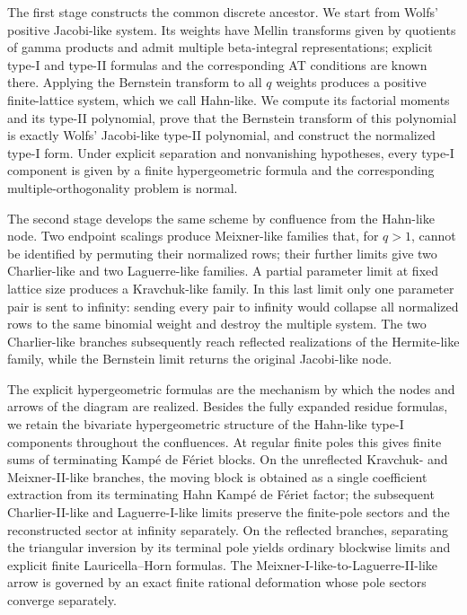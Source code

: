 \documentclass[10pt]{amsart}
\theoremstyle{plain}
\theoremstyle{definition}
\theoremstyle{remark}
\begin{document}
The first stage constructs the common discrete ancestor. We start from
Wolfs' positive Jacobi-like system. Its weights have Mellin transforms
given by quotients of gamma products and admit multiple beta-integral
representations; explicit type-I and type-II formulas and the
corresponding AT conditions are known there. Applying the
Bernstein transform to all \(q\) weights produces a positive
finite-lattice system, which we call Hahn-like. We compute its factorial
moments and its type-II polynomial, prove that the Bernstein transform of
this polynomial is exactly Wolfs' Jacobi-like type-II polynomial, and
construct the normalized type-I form. Under explicit separation and
nonvanishing hypotheses, every type-I component is given by a finite
hypergeometric formula and the corresponding multiple-orthogonality
problem is normal.

The second stage develops the same scheme by confluence from the
Hahn-like node. Two endpoint scalings produce Meixner-like families that,
for \(q>1\), cannot be identified by permuting their normalized rows;
their further limits give two Charlier-like and two Laguerre-like
families. A partial parameter limit at fixed lattice size produces a
Kravchuk-like family. In this last limit only one parameter pair is sent
to infinity: sending every pair to infinity would collapse all normalized
rows to the same binomial weight and destroy the multiple system. The two
Charlier-like branches subsequently reach reflected realizations of the
Hermite-like family, while the Bernstein limit returns the original
Jacobi-like node.

The explicit hypergeometric formulas are the mechanism by which the nodes
and arrows of the diagram are realized. Besides the fully expanded
residue formulas, we retain the bivariate hypergeometric structure of the
Hahn-like type-I components throughout the confluences. At regular finite
poles this gives finite sums of terminating Kamp\'e de F\'eriet blocks. On
the unreflected Kravchuk- and Meixner-II-like branches, the moving block is
obtained as a single coefficient extraction from its terminating Hahn
Kamp\'e de F\'eriet factor; the subsequent Charlier-II-like and
Laguerre-I-like limits preserve the finite-pole sectors and the
reconstructed sector at infinity separately. On the reflected branches,
separating the triangular inversion by its terminal pole yields ordinary
blockwise limits and explicit finite Lauricella--Horn formulas. The
Meixner-I-like-to-Laguerre-II-like arrow is governed by an exact finite
rational deformation whose pole sectors converge separately.
\end{document}
